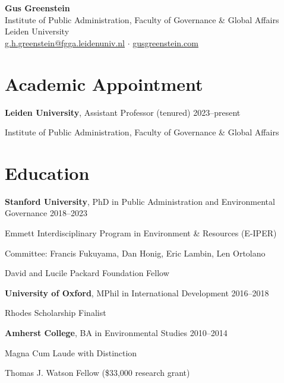\documentclass[11pt, letterpaper]{article}
\newcommand{\cventry}[2]{\noindent #1 \hfill #2\par}
\newcommand{\cvdetail}[1]{\hspace{1em}#1\par}
\begin{document}
\begin{center}
{\LARGE \textbf{Gus Greenstein}} \\[0.6em]
{\normalsize
Institute of Public Administration, Faculty of Governance \& Global Affairs \\
Leiden University \\[0.3em]
\href{mailto:g.h.greenstein@fgga.leidenuniv.nl}{g.h.greenstein@fgga.leidenuniv.nl} \quad $\cdot$ \quad \href{https://www.gusgreenstein.com}{gusgreenstein.com}}
\end{center}

\vspace{0.3em}

\section{Academic Appointment}

\cventry{\textbf{Leiden University}, Assistant Professor (tenured)}{2023--present}
\cvdetail{Institute of Public Administration, Faculty of Governance \& Global Affairs}

\section{Education}

\cventry{\textbf{Stanford University}, PhD in Public Administration and Environmental Governance}{2018--2023}
\cvdetail{Emmett Interdisciplinary Program in Environment \& Resources (E-IPER)}
\cvdetail{Committee: Francis Fukuyama, Dan Honig, Eric Lambin, Len Ortolano}
\cvdetail{David and Lucile Packard Foundation Fellow}

\vspace{0.4em}

\cventry{\textbf{University of Oxford}, MPhil in International Development}{2016--2018}
\cvdetail{Rhodes Scholarship Finalist}

\vspace{0.4em}

\cventry{\textbf{Amherst College}, BA in Environmental Studies}{2010--2014}
\cvdetail{Magna Cum Laude with Distinction}
\cvdetail{Thomas J. Watson Fellow (\$33,000 research grant)}

\end{document}

